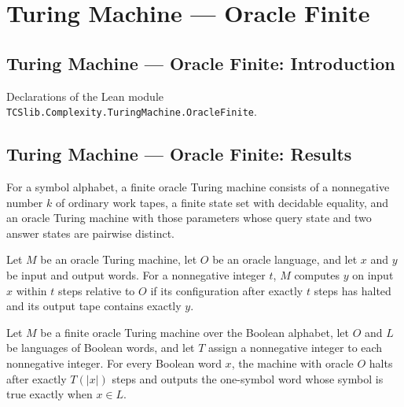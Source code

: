 \section{Turing Machine --- Oracle Finite}
\subsection*{Turing Machine --- Oracle Finite: Introduction}

Declarations of the Lean module \texttt{TCSlib.Complexity.TuringMachine.OracleFinite}.

\subsection*{Turing Machine --- Oracle Finite: Results}

\begin{definition}
\label{Turing.FinOracleTM}
\leanok
{}
For a symbol alphabet, a finite oracle Turing machine consists of a nonnegative number
$k$ of ordinary work tapes, a finite state set with decidable equality, and an oracle
Turing machine with those parameters whose query state and two answer states are
pairwise distinct.
\end{definition}

\begin{definition}
\label{Turing.FinOracleTM.ComputesInTime}
\leanok
{}
Let $M$ be an oracle Turing machine, let $O$ be an oracle language, and let $x$ and $y$
be input and output words. For a nonnegative integer $t$, $M$ computes $y$ on input $x$
within $t$ steps relative to $O$ if its configuration after exactly $t$ steps has halted
and its output tape contains exactly $y$.
\end{definition}

\begin{definition}
\label{Turing.FinOracleTM.DecidesInTime}
\leanok
{}
Let $M$ be a finite oracle Turing machine over the Boolean alphabet, let $O$ and $L$ be
languages of Boolean words, and let $T$ assign a nonnegative integer to each nonnegative
integer. For every Boolean word $x$, the machine with oracle $O$ halts after exactly
$T(|x|)$ steps and outputs the one-symbol word whose symbol is true exactly when $x\in
L$.
\end{definition}

